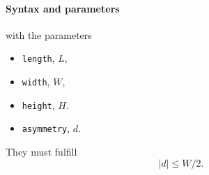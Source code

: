\begin{figure}[h]
\hfill
{}
\hfill
{}
\hfill
{}
\hfill
\end{figure}

\FloatBarrier

\paragraph{Syntax and parameters}
\begin{quote}
\end{quote}
with the parameters
\begin{itemize}
\item \texttt{length}, $L$, 
\item \texttt{width}, $W$, 
\item \texttt{height}, $H$. 
\item \texttt{asymmetry}, $d$. 
\end{itemize}
They must fulfill
\begin{displaymath}
  |d| \le W/2.
\end{displaymath}



